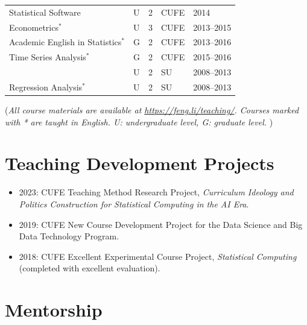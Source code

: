 \documentclass[twoside,a4paper]{article}
\begin{document}
\begin{center}
\begin{tabular}{p{7.5cm}llll}
    Statistical Software                  & U          & 2      & CUFE  & 2014       \\
    Econometrics$^*$                      & U          & 3      & CUFE  & 2013--2015 \\
    Academic English in Statistics$^*$    & G          & 2      & CUFE  & 2013--2016 \\
    Time Series Analysis$^*$              & G          & 2      & CUFE  & 2015--2016 \\
                                          & U          & 2      & SU    & 2008--2013 \\
    Regression Analysis$^*$               & U          & 2      & SU    & 2008--2013 \\
    \bottomrule
  \end{tabular}
\end{center}

{\footnotesize (\emph{All course materials are available at
    \emph{\url{https://feng.li/teaching/}}. Courses marked with * are taught in English. U: undergraduate level, G: graduate level. })}


\section{Teaching Development Projects}

\begin{itemize}
\item 2023: CUFE Teaching Method Research Project, \emph{Curriculum Ideology and Politics Construction for Statistical Computing in the AI Era}.
\item 2019: CUFE New Course Development Project for the Data Science and Big Data Technology Program.
\item 2018: CUFE Excellent Experimental Course Project, \emph{Statistical Computing} (completed with excellent evaluation).
\end{itemize}


\section{Mentorship}
\end{document}
